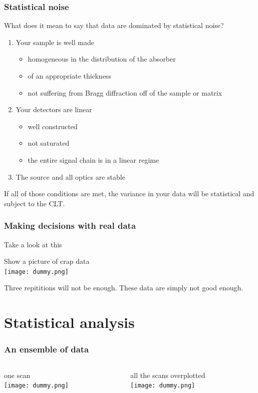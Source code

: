 \documentclass[10pt, xcolor=x11names, compress]{beamer}
\begin{document}
\begin{frame}
  \frametitle{Statistical noise}
  What does it mean to say that data are dominated by statistical
  noise?
  \begin{enumerate}
  \item Your sample is well made
    \begin{itemize}
    \item homogeneous in the distribution of the absorber
    \item of an appropriate thickness
    \item not suffering from Bragg diffraction off of the sample or matrix
    \end{itemize}
  \item Your detectors are linear
    \begin{itemize}
    \item well constructed
    \item not saturated
    \item the entire signal chain is in a linear regime
    \end{itemize}
  \item The source and all optics are stable
  \end{enumerate}
  \begin{alertblock}{}
    If all of those conditions are met, the variance in your data will
    be statistical and subject to the CLT.
  \end{alertblock}
\end{frame}

\begin{frame}
  \frametitle{Making decisions with real data}
  Take a look at this

  \begin{center}
    Show a picture of crap data\\
    \texttt{[image: dummy.png]}
  \end{center}


  Three repititions will not be enough.  These data are simply not
  good enough.
\end{frame}

\section{Statistical analysis}

\begin{frame}
  \frametitle{An ensemble of data}
  \begin{columns}[T]
    \begin{column}{0.5\linewidth}
      one scan\\
      \texttt{[image: dummy.png]}
    \end{column}
    \begin{column}{0.5\linewidth}
      all the scans overplotted\\
      \texttt{[image: dummy.png]}
    \end{column}
  \end{columns}
\end{frame}
\end{document}
